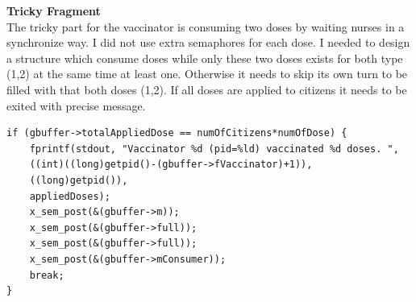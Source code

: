 \documentclass{article}
\begin{document}
\textbf{Tricky Fragment}\\
The tricky part for the vaccinator is consuming two doses by waiting nurses in a synchronize way. I did not use extra semaphores for each dose. I needed to design a structure which consume doses while only these two doses exists for both type (1,2) at the same time at least one. Otherwise it needs to skip its own turn to be filled with that both doses (1,2). If all doses are applied to citizens it needs to be exited with precise message.
\begin{lstlisting}[style=CStyle]
if (gbuffer->totalAppliedDose == numOfCitizens*numOfDose) {
    fprintf(stdout, "Vaccinator %d (pid=%ld) vaccinated %d doses. ",
    ((int)((long)getpid()-(gbuffer->fVaccinator)+1)),
    ((long)getpid()),
    appliedDoses);
    x_sem_post(&(gbuffer->m));
    x_sem_post(&(gbuffer->full));
    x_sem_post(&(gbuffer->full));
    x_sem_post(&(gbuffer->mConsumer));
    break;
}
\end{lstlisting}
\end{document}
